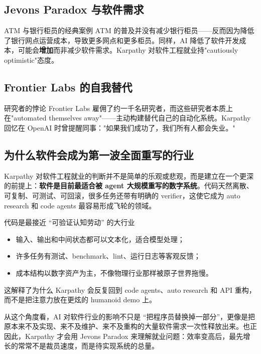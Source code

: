 \documentclass[a4paper]{article}
\begin{document}
\subsection{Jevons Paradox 与软件需求}

\begin{knowledgebox}{ATM 与银行柜员的经典案例}
ATM 的普及并没有减少银行柜员——反而因为降低了银行网点运营成本，导致更多网点和更多柜员。同样，AI 降低了软件开发成本，可能会\textbf{增加}而非减少软件需求。Karpathy 对软件工程就业持"cautiously optimistic"态度。
\end{knowledgebox}

\subsection{Frontier Labs 的自我替代}

\begin{warningbox}{研究者的悖论}
Frontier Labs 雇佣了约一千名研究者，而这些研究者本质上在"automated themselves away"——主动构建替代自己的自动化系统。Karpathy 回忆在 OpenAI 时曾提醒同事："如果我们成功了，我们所有人都会失业。"
\end{warningbox}

\subsection{为什么软件会成为第一波全面重写的行业}
Karpathy 对软件工程就业的判断并不是简单的乐观或悲观，而是建立在一个更深的前提上：\textbf{软件是目前最适合被 agent 大规模重写的数字系统}。代码天然离散、可复制、可测试、可回滚，很多任务还带有明确的 verifier，这使它成为 auto research 和 code agents 最容易形成飞轮的领域。

\begin{importantbox}{代码是最接近 ``可验证认知劳动'' 的大行业}
\begin{itemize}
    \item 输入、输出和中间状态都可以文本化，适合模型处理；
    \item 许多任务有测试、benchmark、lint、运行日志等客观反馈；
    \item 成本结构以数字资产为主，不像物理行业那样被原子世界拖慢。
\end{itemize}
这解释了为什么 Karpathy 会反复回到 code agents、auto research 和 API 重构，而不是把注意力放在更炫的 humanoid demo 上。
\end{importantbox}

从这个角度看，AI 对软件行业的影响不只是 ``把程序员替换掉一部分''，更像是把原本来不及实现、来不及维护、来不及重构的大量软件需求一次性释放出来。也正因此，Karpathy 才会用 Jevons Paradox 来理解就业问题：效率变高后，最先增长的常常不是裁员速度，而是待实现系统的总量。
\end{document}
